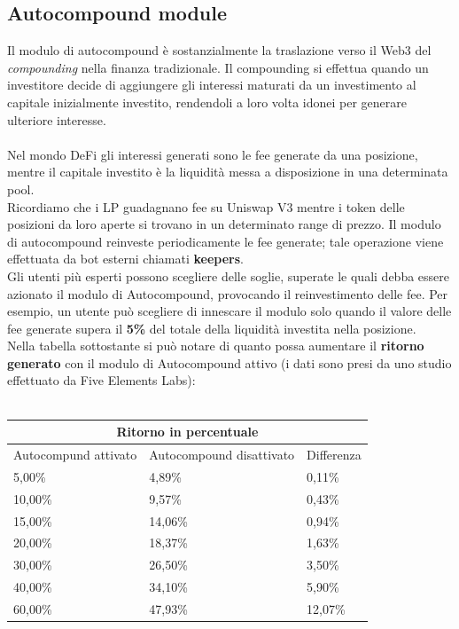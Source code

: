 \documentclass[12pt,a4paper]{report}
\begin{document}
\subsection{Autocompound module}

Il modulo di autocompound è sostanzialmente la traslazione verso il Web3 del \textit{compounding} nella finanza tradizionale. Il compounding si effettua quando un investitore decide di aggiungere gli interessi maturati da un investimento al capitale inizialmente investito, rendendoli a loro volta idonei per generare ulteriore interesse.
\\\\Nel mondo DeFi gli interessi generati sono le fee generate da una posizione, mentre il capitale investito è la liquidità messa a disposizione in una determinata pool.
\\Ricordiamo che i LP guadagnano fee su Uniswap V3 mentre i token delle posizioni da loro aperte si trovano in un determinato range di prezzo.
Il modulo di autocompound reinveste periodicamente le fee generate; tale operazione viene effettuata da bot esterni chiamati \textbf{keepers}.
\\Gli utenti più esperti possono scegliere delle soglie, superate le quali debba essere azionato il modulo di Autocompound, provocando il reinvestimento delle fee.
Per esempio, un utente può scegliere di innescare il modulo solo quando il valore delle fee generate supera il \textbf{5\%} del totale della liquidità investita nella posizione.
\\Nella tabella sottostante si può notare di quanto possa aumentare il \textbf{ritorno generato} con il modulo di Autocompound attivo (i dati sono presi da uno studio effettuato da Five Elements Labs): 
\\\\

\begin{center}
\begin{tabular}{ |p{5cm}|p{5cm}|p{2cm}| }
 \hline
 \multicolumn{3}{|c|}{Ritorno in percentuale} \\
 \hline
 Autocompund attivato& Autocompound disattivato &Differenza\\
 \hline
 5,00\%   & 4,89\%    &0,11\%  \\
 \hline
 10,00\%   & 9,57\%    &0,43\%  \\
 \hline
 15,00\%   & 14,06\%    &0,94\%  \\
 \hline
 20,00\%   & 18,37\%    &1,63\%  \\
 \hline
 30,00\%   & 26,50\%    &3,50\%  \\
 \hline
 40,00\%   & 34,10\%    &5,90\%  \\
 \hline
 60,00\%   & 47,93\%    &12,07\%  \\
 \hline
\end{tabular}
\end{center}
\\\\
\end{document}
